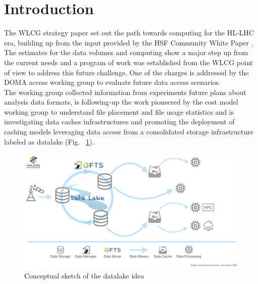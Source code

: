 \section{Introduction}
The WLCG strategy paper \cite{wlcg} set out the path towards computing for the HL-LHC era, building up from the input provided by the HSF \cite{hsf} Community White Paper \cite{cwp}.
The estimates for the data volumes and computing show a major step up from the current needs and a program of work was established from the WLCG point of view to address this future challenge. One of the charges is addressed by the DOMA access working group to evaluate future data access scenarios.\\
The working group collected information from experiments future plans about analysis data formats, is following-up the work pioneered by the cost model working group to understand file placement and file usage statistics and is investigating data caches infrastructures and promoting the deployment of caching models leveraging data access from a consolidated storage infrastructure labeled as datalake (Fig. ~\ref{datalake-sketch-horizontal}).

\begin{figure}
  \centering
  \includegraphics[height=6cm]{Datalake-sketch-horizontal.png}
  \caption{{\em} Conceptual sketch of the datalake idea}
  \label{datalake-sketch-horizontal}
\end{figure}



